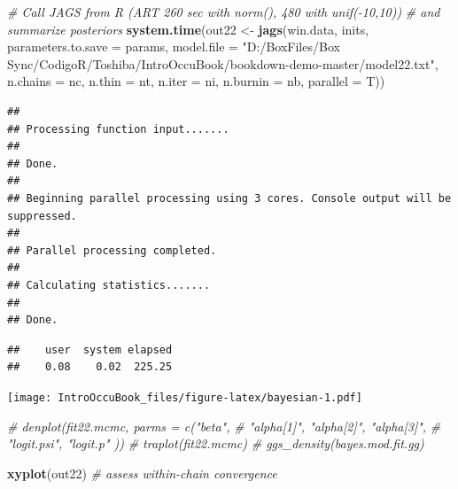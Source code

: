 \documentclass[
]{book}
\newenvironment{Shaded}{\begin{snugshade}}{\end{snugshade}}
\newcommand{\CommentTok}[1]{\textcolor[rgb]{0.56,0.35,0.01}{\textit{#1}}}
\newcommand{\DataTypeTok}[1]{\textcolor[rgb]{0.13,0.29,0.53}{#1}}
\newcommand{\KeywordTok}[1]{\textcolor[rgb]{0.13,0.29,0.53}{\textbf{#1}}}
\newcommand{\NormalTok}[1]{#1}
\newcommand{\OperatorTok}[1]{\textcolor[rgb]{0.81,0.36,0.00}{\textbf{#1}}}
\newcommand{\StringTok}[1]{\textcolor[rgb]{0.31,0.60,0.02}{#1}}
\begin{document}
\begin{Shaded}
\begin{Highlighting}[]
\CommentTok{# Call JAGS from R (ART 260 sec with norm(), 480 with unif(-10,10)) }
\CommentTok{# and summarize posteriors}
\KeywordTok{system.time}\NormalTok{(out22 <-}\StringTok{ }\KeywordTok{jags}\NormalTok{(win.data, inits, }\DataTypeTok{parameters.to.save =}\NormalTok{ params,}
                      \DataTypeTok{model.file =} \StringTok{"D:/BoxFiles/Box Sync/CodigoR/Toshiba/IntroOccuBook/bookdown-demo-master/model22.txt"}\NormalTok{, }
                          \DataTypeTok{n.chains =}\NormalTok{ nc, }
                          \DataTypeTok{n.thin =}\NormalTok{ nt, }
                          \DataTypeTok{n.iter =}\NormalTok{ ni, }
                          \DataTypeTok{n.burnin =}\NormalTok{ nb, }
                          \DataTypeTok{parallel =}\NormalTok{ T))}
\end{Highlighting}
\end{Shaded}

\begin{verbatim}
##
## Processing function input.......
##
## Done.
##
## Beginning parallel processing using 3 cores. Console output will be suppressed.
##
## Parallel processing completed.
##
## Calculating statistics.......
##
## Done.
\end{verbatim}

\begin{verbatim}
##    user  system elapsed
##    0.08    0.02  225.25
\end{verbatim}

\begin{Shaded}
\end{Shaded}

\texttt{[image: IntroOccuBook\_files/figure-latex/bayesian-1.pdf]}

\begin{Shaded}
\begin{Highlighting}[]
\CommentTok{# denplot(fit22.mcmc, parms = c("beta", }
\CommentTok{#                               "alpha[1]", "alpha[2]", "alpha[3]", }
\CommentTok{#                               "logit.psi", "logit.p" ))}
\CommentTok{# traplot(fit22.mcmc)}
\CommentTok{# ggs_density(bayes.mod.fit.gg)}

\KeywordTok{xyplot}\NormalTok{(out22)        }\CommentTok{# assess within-chain convergence}
\end{Highlighting}
\end{Shaded}
\end{document}
